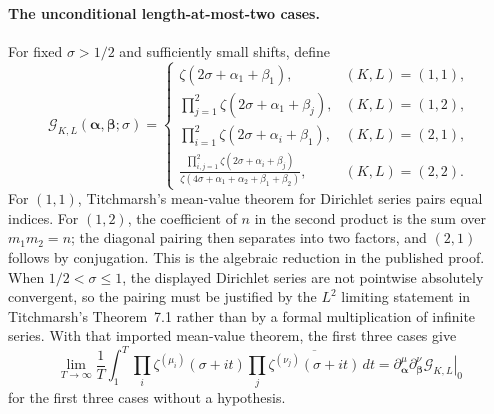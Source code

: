\paragraph{The unconditional length-at-most-two cases.}
For fixed $\sigma>1/2$ and sufficiently small shifts, define
\begin{equation}
 \mathcal G_{K,L}(\boldsymbol\alpha,\boldsymbol\beta;\sigma)
 =\begin{cases}
 \zeta(2\sigma+\alpha_1+\beta_1),&(K,L)=(1,1),\\
 \prod_{j=1}^{2}\zeta(2\sigma+\alpha_1+\beta_j),&(K,L)=(1,2),\\
 \prod_{i=1}^{2}\zeta(2\sigma+\alpha_i+\beta_1),&(K,L)=(2,1),\\
 \displaystyle
 \frac{\prod_{i,j=1}^{2}\zeta(2\sigma+\alpha_i+\beta_j)}
 {\zeta(4\sigma+\alpha_1+\alpha_2+\beta_1+\beta_2)},&(K,L)=(2,2).
 \end{cases}
 \label{eq:GMS-audit-low-length-G}
\end{equation}
For $(1,1)$, Titchmarsh's mean-value theorem for Dirichlet series pairs equal indices.  For
$(1,2)$, the coefficient of $n$ in the second product is the sum over $m_1m_2=n$; the diagonal
pairing then separates into two factors, and $(2,1)$ follows by conjugation.  This is the
algebraic reduction in the published proof.  When $1/2<\sigma\leq1$, the displayed Dirichlet
series are not pointwise absolutely convergent, so the pairing must be justified by the
$L^2$ limiting statement in Titchmarsh's Theorem~7.1 rather than by a formal multiplication of
infinite series.  With that imported mean-value theorem, the first three cases give
\begin{equation}
 \lim_{T\to\infty}\frac1T\int_1^T
 \prod_i\zeta^{(\mu_i)}(\sigma+it)
 \prod_j\overline{\zeta^{(\nu_j)}(\sigma+it)}\,dt
 =\left.
 \partial_{\boldsymbol\alpha}^{\mu}
 \partial_{\boldsymbol\beta}^{\nu}
 \mathcal G_{K,L}\right|_{0}
 \label{eq:GMS-audit-low-length-mean}
\end{equation}
for the first three cases without a hypothesis.

